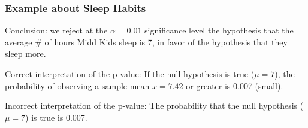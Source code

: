 \documentclass[handout]{beamer}
\newcommand{\blue}[1]{\textcolor{blue2}{#1}}
\newcommand{\xbar}{\overline{x}}
\begin{document}
%


\begin{frame}
\frametitle{Example about Sleep Habits}

\blue{Conclusion}: we reject at the $\alpha=0.01$ significance level the hypothesis that the average \# of hours Midd Kids sleep is 7, in favor of the hypothesis that they sleep more.  

\vspace{0.5cm}

\pause\blue{Correct interpretation of the p-value}:  If the null hypothesis is true ($\mu=7$), the probability of observing a sample mean $\xbar=7.42$ or greater is 0.007 (small).  

\vspace{0.5cm}

\pause\blue{Incorrect interpretation of the p-value}:  The probability that the null hypothesis ($\mu=7$) is true is 0.007.  

\end{frame}


%
%
\end{document}
